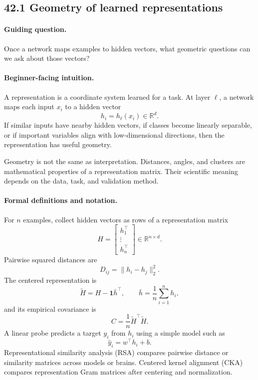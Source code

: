 \subsection{42.1 Geometry of learned representations}

\paragraph{Guiding question.}
Once a network maps examples to hidden vectors, what geometric questions can we ask about those vectors?

\paragraph{Beginner-facing intuition.}
A representation is a coordinate system learned for a task. At layer \(\ell\), a network maps each input \(x_i\) to a hidden vector
\[
h_i=h_\ell(x_i)\in\mathbb{R}^d.
\]
If similar inputs have nearby hidden vectors, if classes become linearly separable, or if important variables align with low-dimensional directions, then the representation has useful geometry.

Geometry is not the same as interpretation. Distances, angles, and clusters are mathematical properties of a representation matrix. Their scientific meaning depends on the data, task, and validation method.

\paragraph{Formal definitions and notation.}
For \(n\) examples, collect hidden vectors as rows of a representation matrix
\[
H=
\begin{bmatrix}
h_1^\top\\
\vdots\\
h_n^\top
\end{bmatrix}
\in\mathbb{R}^{n\times d}.
\]
Pairwise squared distances are
\[
D_{ij}=\|h_i-h_j\|_2^2.
\]
The centered representation is
\[
\widetilde H=H-\mathbf{1}\bar h^\top,\qquad
\bar h=\frac1n\sum_{i=1}^{n}h_i,
\]
and its empirical covariance is
\[
C=\frac1n\widetilde H^\top\widetilde H.
\]
A linear probe predicts a target \(y_i\) from \(h_i\) using a simple model such as
\[
\widehat y_i=w^\top h_i+b.
\]
Representational similarity analysis (RSA) compares pairwise distance or similarity matrices across models or brains. Centered kernel alignment (CKA) compares representation Gram matrices after centering and normalization.

